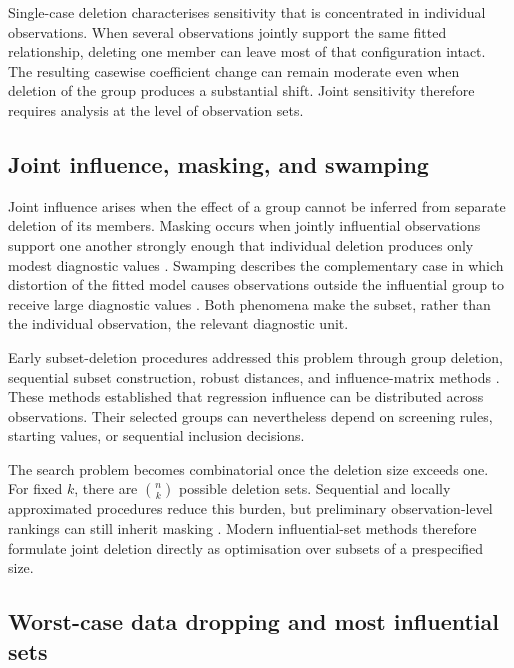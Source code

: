 \documentclass[../main.tex]{subfiles}
\begin{document}
Single-case deletion characterises sensitivity that is concentrated in individual observations. When several observations jointly support the same fitted relationship, deleting one member can leave most of that configuration intact. The resulting casewise coefficient change can remain moderate even when deletion of the group produces a substantial shift. Joint sensitivity therefore requires analysis at the level of observation sets.

\subsection{Joint influence, masking, and swamping}
\label{subsec:joint_influence}

Joint influence arises when the effect of a group cannot be inferred from separate deletion of its members. Masking occurs when jointly influential observations support one another strongly enough that individual deletion produces only modest diagnostic values \parencite{atkinson1986masking,rousseeuw1990unmasking}. Swamping describes the complementary case in which distortion of the fitted model causes observations outside the influential group to receive large diagnostic values \parencite{rousseeuw1990unmasking,hadi1993procedures}. Both phenomena make the subset, rather than the individual observation, the relevant diagnostic unit.

Early subset-deletion procedures addressed this problem through group deletion, sequential subset construction, robust distances, and influence-matrix methods \parencite{andrews1978finding,hadi1992identifying,hadi1993procedures,pena1995detection}. These methods established that regression influence can be distributed across observations. Their selected groups can nevertheless depend on screening rules, starting values, or sequential inclusion decisions.

The search problem becomes combinatorial once the deletion size exceeds one. For fixed \(k\), there are \(\binom{n}{k}\) possible deletion sets. Sequential and locally approximated procedures reduce this burden, but preliminary observation-level rankings can still inherit masking \parencite{pena2005new,zhao2019multiple,kuschnig2021hidden}. Modern influential-set methods therefore formulate joint deletion directly as optimisation over subsets of a prespecified size.

\subsection{Worst-case data dropping and most influential sets}
\label{subsec:worst_case_data_dropping}
\end{document}
